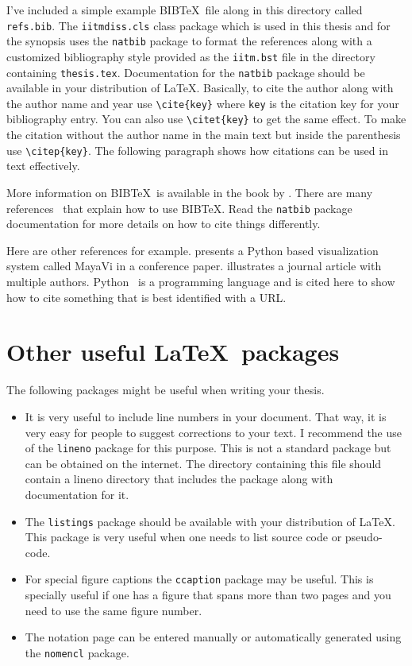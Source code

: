\documentclass[BTech]{iitmdiss}
\begin{document}
I've included a simple example BIB\TeX\ file along in this directory
called \verb+refs.bib+.  The \verb+iitmdiss.cls+ class package which
is used in this thesis and for the synopsis uses the \verb+natbib+
package to format the references along with a customized bibliography
style provided as the \verb+iitm.bst+ file in the directory containing
\verb+thesis.tex+.  Documentation for the \verb+natbib+ package should
be available in your distribution of \LaTeX.  Basically, to cite the
author along with the author name and year use \verb+\cite{key}+ where
\verb+key+ is the citation key for your bibliography entry.  You can
also use \verb+\citet{key}+ to get the same effect.  To make the
citation without the author name in the main text but inside the
parenthesis use \verb+\citep{key}+.  The following paragraph shows how
citations can be used in text effectively.

More information on BIB\TeX\ is available in the book by
\cite{lamport:86}.  There are many
references~\citep{lamport:86,prabhu:xx} that explain how to use
BIB\TeX.  Read the \verb+natbib+ package documentation for more
details on how to cite things differently.

Here are other references for example.  \citet{viz:mayavi} presents a
Python based visualization system called MayaVi in a conference paper.
\citet{pan:pr:flat-fst} illustrates a journal article with multiple
authors.  Python~\citep{py:python} is a programming language and is
cited here to show how to cite something that is best identified with
a URL.

\section{Other useful \LaTeX\ packages}

The following packages might be useful when writing your thesis.

\begin{itemize}  
\item It is very useful to include line numbers in your document.
  That way, it is very easy for people to suggest corrections to your
  text.  I recommend the use of the \texttt{lineno} package for this
  purpose.  This is not a standard package but can be obtained on the
  internet.  The directory containing this file should contain a
  lineno directory that includes the package along with documentation
  for it.

\item The \texttt{listings} package should be available with your
  distribution of \LaTeX.  This package is very useful when one needs
  to list source code or pseudo-code.

\item For special figure captions the \texttt{ccaption} package may be
  useful.  This is specially useful if one has a figure that spans
  more than two pages and you need to use the same figure number.

\item The notation page can be entered manually or automatically
  generated using the \texttt{nomencl} package.

\end{itemize}
\end{document}
